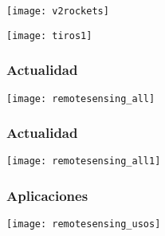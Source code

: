 \documentclass[]{beamer}
\begin{document}
\begin{frame}
\begin{center}
\texttt{[image: v2rockets]}
\end{center}
\end{frame}
\begin{frame}
\begin{center}
\texttt{[image: tiros1]}
\end{center}
\end{frame}
\begin{frame}
\frametitle{Actualidad}
\begin{center}
\texttt{[image: remotesensing\_all]}
\end{center}
\end{frame}
\begin{frame}
\frametitle{Actualidad}
\begin{center}
\texttt{[image: remotesensing\_all1]}
\end{center}
\end{frame}
\begin{frame}
\frametitle{Aplicaciones}
\begin{center}
\texttt{[image: remotesensing\_usos]}
\end{center}
\end{frame}
\end{document}
